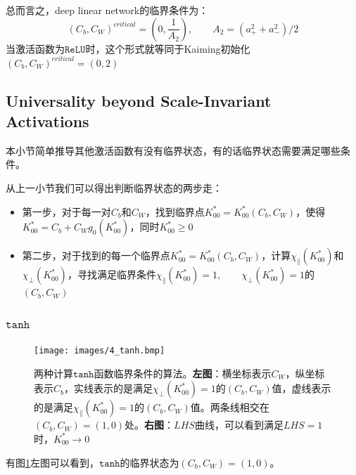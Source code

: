 总而言之，deep linear network的临界条件为：
\begin{equation}
    (C_b, C_W)^{critical}=(0, \frac{1}{A_2}), \qquad A_2=(a_{+}^2+a_{-}^2)/2
\end{equation}
当激活函数为$\mathtt{ReLU}$时，这个形式就等同于Kaiming初始化$(C_b, C_W)^{critical}=(0, 2)$

\subsection{Universality beyond Scale-Invariant Activations}
本小节简单推导其他激活函数有没有临界状态，有的话临界状态需要满足哪些条件。

从上一小节我们可以得出判断临界状态的两步走：
\begin{itemize}
    \item 第一步，对于每一对$C_b$和$C_W$，找到临界点$K_{00}^*=K_{00}^*(C_b, C_W)$，使得$K_{00}^*=C_b+C_W g_0(K_{00}^*)$，同时$K_{00}^*\ge0$
    \item 第二步，对于找到的每一个临界点$K_{00}^*=K_{00}^*(C_b, C_W)$，计算$\chi_\parallel(K_{00}^*)$和$\chi_\perp(K_{00}^*)$，寻找满足临界条件$\chi_\parallel(K_{00}^{*})=1, \qquad \chi_\perp(K_{00}^{*})=1$的$(C_b, C_W)$
\end{itemize}

\subsubsection{$\texttt{tanh}$}
\begin{figure}[!ht]
    \texttt{[image: images/4\_tanh.bmp]}
    \caption{
        两种计算$\mathtt{tanh}$函数临界条件的算法。\textbf{左图}：横坐标表示$C_W$，纵坐标表示$C_b$，实线表示的是满足$\chi_\perp(K_{00}^{*})=1$的$(C_b, C_W)$值，虚线表示的是满足$\chi_\parallel(K_{00}^{*})=1$的$(C_b, C_W)$值。两条线相交在$(C_b, C_W)=(1,0)$处。\textbf{右图}：$LHS$曲线，可以看到满足$LHS=1$时，$K_{00}^*\to0$
    }
    \label{fig:4-tanh}
\end{figure}
有图\ref{fig:4-tanh}左图可以看到，$\texttt{tanh}$的临界状态为$(C_b, C_W)=(1,0)$。

